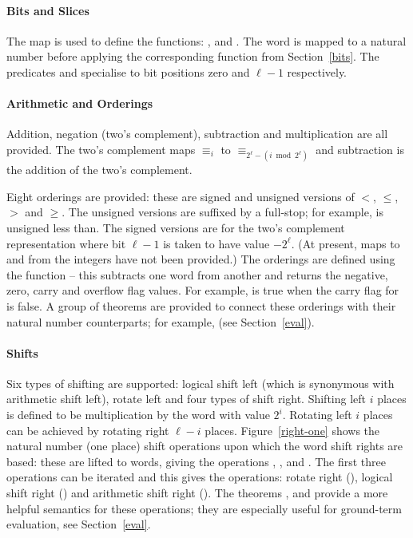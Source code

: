 {\paragraph{Bits and Slices}

The map  is used to define the functions: ,
 and .  The word is mapped to a natural
number before applying the corresponding function from
Section~\ref{bits}.  The predicates  and  specialise
 to bit positions zero and $\ell - 1$ respectively.

\paragraph{Arithmetic and Orderings}

Addition, negation (two's complement), subtraction and multiplication
are all provided.  The two's complement maps ${\equiv_i}$ to
${\equiv_{2^\ell - (i \bmod 2^\ell)}}$ and subtraction is the addition
of the two's complement.

Eight orderings are provided: these are signed and unsigned versions
of $<$, $\leq$, $>$ and $\geq$.  The unsigned versions are suffixed by
a full-stop; for example,  is unsigned less than.  The signed
versions are for the two's complement representation \ie{} where bit
$\ell - 1$ is taken to have value $-2^\ell$.  (At present, maps to and
from the integers have not been provided.)  The orderings are defined
using the function  -- this subtracts one word from
another and returns the negative, zero, carry and overflow flag
values.  For example,  is true when the carry flag for
 is false.  A group of theorems are provided to connect
these orderings with their natural number counterparts; for example,
 (see Section~\ref{eval}).

\paragraph{Shifts}

Six types of shifting are supported: logical shift left (which is
synonymous with arithmetic shift left), rotate left and four types of
shift right.  Shifting left $i$ places is defined to be multiplication
by the word with value $2^i$.  Rotating left $i$ places can be achieved
by rotating right $\ell - i$ places.  Figure~\ref{right-one} shows the
natural number (one place) shift operations upon which the word shift
rights are based: these are lifted to words, giving the operations
, ,  and .  The
first three operations can be iterated and this gives the operations:
rotate right (\ml{\#>>}), logical shift right (\ml{>>>}) and
arithmetic shift right (\ml{>>}).  The theorems ,
 and  provide a more helpful semantics for
these operations; they are especially useful for ground-term
evaluation, see Section~\ref{eval}.

}
